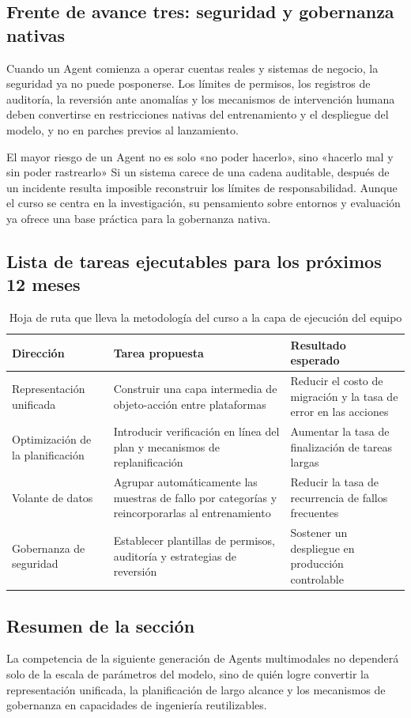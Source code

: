 \subsection{Frente de avance tres: seguridad y gobernanza nativas}
Cuando un Agent comienza a operar cuentas reales y sistemas de negocio, la seguridad ya no puede posponerse. Los límites de permisos, los registros de auditoría, la reversión ante anomalías y los mecanismos de intervención humana deben convertirse en restricciones nativas del entrenamiento y el despliegue del modelo, y no en parches previos al lanzamiento.

\begin{warningbox}{El mayor riesgo de un Agent no es solo «no poder hacerlo», sino «hacerlo mal y sin poder rastrearlo»}
Si un sistema carece de una cadena auditable, después de un incidente resulta imposible reconstruir los límites de responsabilidad. Aunque el curso se centra en la investigación, su pensamiento sobre entornos y evaluación ya ofrece una base práctica para la gobernanza nativa.
\end{warningbox}

\subsection{Lista de tareas ejecutables para los próximos 12 meses}
\begin{table}[H]
\centering
\begin{tabular}{p{2.8cm}p{4.8cm}p{3.6cm}}
\toprule
\textbf{Dirección} & \textbf{Tarea propuesta} & \textbf{Resultado esperado} \\
\midrule
Representación unificada & Construir una capa intermedia de objeto-acción entre plataformas & Reducir el costo de migración y la tasa de error en las acciones \\
Optimización de la planificación & Introducir verificación en línea del plan y mecanismos de replanificación & Aumentar la tasa de finalización de tareas largas \\
Volante de datos & Agrupar automáticamente las muestras de fallo por categorías y reincorporarlas al entrenamiento & Reducir la tasa de recurrencia de fallos frecuentes \\
Gobernanza de seguridad & Establecer plantillas de permisos, auditoría y estrategias de reversión & Sostener un despliegue en producción controlable \\
\bottomrule
\end{tabular}
\caption{Hoja de ruta que lleva la metodología del curso a la capa de ejecución del equipo}
\end{table}

\subsection{Resumen de la sección}
La competencia de la siguiente generación de Agents multimodales no dependerá solo de la escala de parámetros del modelo, sino de quién logre convertir la representación unificada, la planificación de largo alcance y los mecanismos de gobernanza en capacidades de ingeniería reutilizables.

